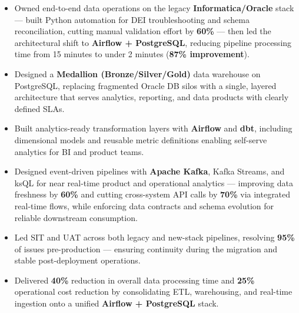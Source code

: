 

\begin{itemize}
  \item Owned end-to-end data operations on the legacy \textbf{Informatica/Oracle} stack ---
        built Python automation for DEI troubleshooting and schema reconciliation,
        cutting manual validation effort by \textbf{60\%} --- then led the architectural
        shift to \textbf{Airflow + PostgreSQL}, reducing pipeline processing time from
        15 minutes to under 2 minutes (\textbf{87\% improvement}).

  \item Designed a \textbf{Medallion (Bronze/Silver/Gold)} data warehouse on PostgreSQL,
        replacing fragmented Oracle DB silos with a single, layered architecture that
        serves analytics, reporting, and data products with clearly defined SLAs.

  \item Built analytics-ready transformation layers with \textbf{Airflow} and \textbf{dbt},
        including dimensional models and reusable metric definitions enabling self-serve
        analytics for BI and product teams.

  \item Designed event-driven pipelines with \textbf{Apache Kafka}, Kafka Streams, and ksQL
        for near real-time product and operational analytics --- improving data freshness
        by \textbf{60\%} and cutting cross-system API calls by \textbf{70\%} via integrated
        real-time flows, while enforcing data contracts and schema evolution for reliable
        downstream consumption.

  \item Led SIT and UAT across both legacy and new-stack pipelines, resolving \textbf{95\%}
        of issues pre-production --- ensuring continuity during the migration and stable
        post-deployment operations.

  \item Delivered \textbf{40\%} reduction in overall data processing time and
        \textbf{25\%} operational cost reduction by consolidating ETL, warehousing,
        and real-time ingestion onto a unified \textbf{Airflow + PostgreSQL} stack.
\end{itemize}
